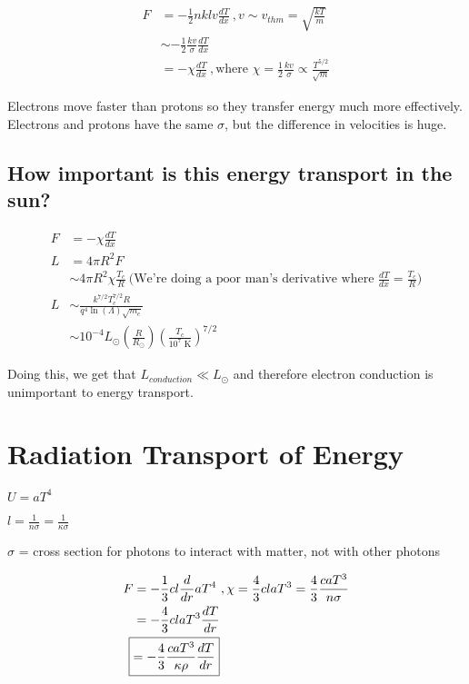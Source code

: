 \documentclass[10pt,letterpaper,final]{book}
\newcommand{\pt}{\propto}
\newcommand{\rp}{\right)}
\newcommand{\lp}{\left(}
\begin{document}
\begin{align}
F &=-\frac{1}{2}nklv\frac{dT}{dx}~,v \sim v_{thm} = \sqrt{\frac{kT}{m}}\\
&\sim -\frac{1}{2} \frac{kv}{\sigma}\frac{dT}{dx}\\
&=-\chi \frac{dT}{dx}~,\text{where }\chi =\frac{1}{2}\frac{kv}{\sigma} \pt \frac{T^{5/2}}{\sqrt{m}}
\end{align}

Electrons move faster than protons so they transfer energy much more effectively. Electrons and protons have the same $\sigma$, but the difference in velocities is huge.

\subsection{How important is this energy transport in the sun?}

\begin{align}
F &= -\chi \frac{dT}{dx}\\
L &= 4 \pi R^2 F\\
&\sim 4 \pi R^2 \chi \frac{T_c}{R}~\text{(We're doing a poor man's derivative where $\frac{dT}{dx} = \frac{T_c}{R}$)}\\
L &\sim \frac{k^{7/2} T_c^{7/2} R}{q^4 \ln (\Lambda) \sqrt{m_e}}\\
&\sim 10^{-4} L_\odot \lp \frac{R}{R_\odot} \rp \lp \frac{T_c}{10^7\text{ K} } \rp^{7/2}
\end{align}

Doing this, we get that $L_{conduction} \ll L_\odot$ and therefore electron conduction is unimportant to energy transport. 

\section{Radiation Transport of Energy}
\begin{list}{}{}
\item $U = aT^4$
\item $l = \frac{1}{n \sigma} = \frac{1}{\kappa \sigma}$
\item $\sigma$ = cross section for photons to interact with matter, not with other photons
\end{list}

\begin{align}
F &=-\frac{1}{3}cl \frac{d}{dr}aT^4~,\chi = \frac{4}{3}claT^3 = \frac{4}{3}\frac{caT^3}{n\sigma} \\
&= -\frac{4}{3}claT^3 \frac{dT}{dr}\\
\Aboxed{&=-\frac{4}{3}\frac{caT^3}{\kappa \rho} \frac{dT}{dr}}
\end{align}
\end{document}
